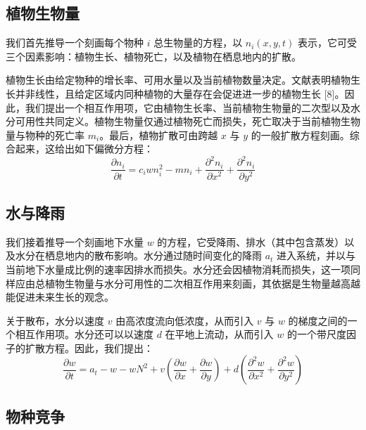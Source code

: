 \documentclass[11pt,a4paper]{ctexart}
\begin{document}
\subsection{植物生物量}

我们首先推导一个刻画每个物种 $i$ 总生物量的方程，以 $n_i(x,y,t)$ 表示，它可受三个因素影响：植物生长、植物死亡，以及植物在栖息地内的扩散。

植物生长由给定物种的增长率、可用水量以及当前植物数量决定。文献表明植物生长并非线性，且给定区域内同种植物的大量存在会促进进一步的植物生长 [8]。因此，我们提出一个相互作用项，它由植物生长率、当前植物生物量的二次型以及水分可用性共同定义。植物生物量仅通过植物死亡而损失，死亡取决于当前植物生物量与物种的死亡率 $m_i$。最后，植物扩散可由跨越 $x$ 与 $y$ 的一般扩散方程刻画。综合起来，这给出如下偏微分方程：
\begin{equation}
\frac{\partial n_i}{\partial t} = c_i w n_i^2 - m n_i + \frac{\partial^2 n_i}{\partial x^2} + \frac{\partial^2 n_i}{\partial y^2}
\end{equation}

\subsection{水与降雨}

我们接着推导一个刻画地下水量 $w$ 的方程，它受降雨、排水（其中包含蒸发）以及水分在栖息地内的散布影响。水分通过随时间变化的降雨 $a_t$ 进入系统，并以与当前地下水量成比例的速率因排水而损失。水分还会因植物消耗而损失，这一项同样应由总植物生物量与水分可用性的二次相互作用来刻画，其依据是生物量越高越能促进未来生长的观念。

关于散布，水分以速度 $v$ 由高浓度流向低浓度，从而引入 $v$ 与 $w$ 的梯度之间的一个相互作用项。水分还可以以速度 $d$ 在平地上流动，从而引入 $w$ 的一个带尺度因子的扩散方程。因此，我们提出：
\begin{equation}
\frac{\partial w}{\partial t} = a_t - w - wN^2 + v\left(\frac{\partial w}{\partial x} + \frac{\partial w}{\partial y}\right) + d\left(\frac{\partial^2 w}{\partial x^2} + \frac{\partial^2 w}{\partial y^2}\right)
\end{equation}

\subsection{物种竞争}
\end{document}
